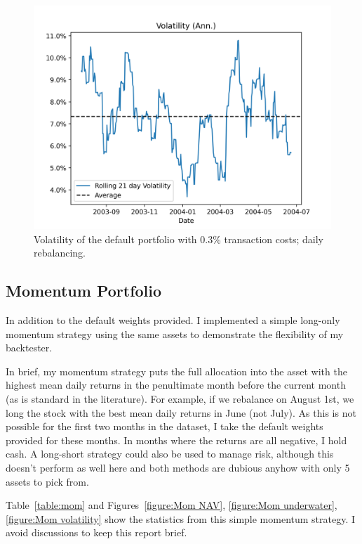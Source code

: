 \documentclass[12pt, oneside, a4paper]{article}
\begin{document}
\begin{figure}
\centering
\includegraphics[width=0.7\linewidth]{./figures/volatility.png}
\caption{Volatility of the default portfolio with 0.3\% transaction costs; daily rebalancing.}
\label{figure:Task volatility}
\end{figure}

\subsection{Momentum Portfolio}

In addition to the default weights provided. I implemented a simple long-only momentum strategy using the same assets to demonstrate the flexibility of my backtester.

In brief, my momentum strategy puts the full allocation into the asset with the highest mean daily returns in the penultimate month before the current month (as is standard in the literature). For example, if we rebalance on August 1st, we long the stock with the best mean daily returns in June (not July). As this is not possible for the first two months in the dataset, I take the default weights provided for these months. In months where the returns are all negative, I hold cash. A long-short strategy could also be used to manage risk, although this doesn't perform as well here and both methods are dubious anyhow with only 5 assets to pick from.

Table~\ref{table:mom} and Figures~\ref{figure:Mom NAV}, \ref{figure:Mom underwater}, \ref{figure:Mom volatility} show the statistics from this simple momentum strategy. I avoid discussions to keep this report brief.



\end{document}
